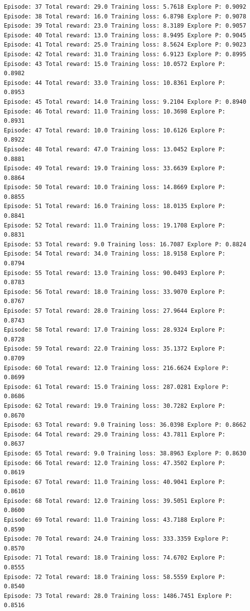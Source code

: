 \documentclass[11pt]{article}
\begin{document}
\begin{Verbatim}[commandchars=\\\{\}]
Episode: 37 Total reward: 29.0 Training loss: 5.7618 Explore P: 0.9092
Episode: 38 Total reward: 16.0 Training loss: 6.8798 Explore P: 0.9078
Episode: 39 Total reward: 23.0 Training loss: 8.3189 Explore P: 0.9057
Episode: 40 Total reward: 13.0 Training loss: 8.9495 Explore P: 0.9045
Episode: 41 Total reward: 25.0 Training loss: 8.5624 Explore P: 0.9023
Episode: 42 Total reward: 31.0 Training loss: 6.9123 Explore P: 0.8995
Episode: 43 Total reward: 15.0 Training loss: 10.0572 Explore P: 0.8982
Episode: 44 Total reward: 33.0 Training loss: 10.8361 Explore P: 0.8953
Episode: 45 Total reward: 14.0 Training loss: 9.2104 Explore P: 0.8940
Episode: 46 Total reward: 11.0 Training loss: 10.3698 Explore P: 0.8931
Episode: 47 Total reward: 10.0 Training loss: 10.6126 Explore P: 0.8922
Episode: 48 Total reward: 47.0 Training loss: 13.0452 Explore P: 0.8881
Episode: 49 Total reward: 19.0 Training loss: 33.6639 Explore P: 0.8864
Episode: 50 Total reward: 10.0 Training loss: 14.8669 Explore P: 0.8855
Episode: 51 Total reward: 16.0 Training loss: 18.0135 Explore P: 0.8841
Episode: 52 Total reward: 11.0 Training loss: 19.1708 Explore P: 0.8831
Episode: 53 Total reward: 9.0 Training loss: 16.7087 Explore P: 0.8824
Episode: 54 Total reward: 34.0 Training loss: 18.9158 Explore P: 0.8794
Episode: 55 Total reward: 13.0 Training loss: 90.0493 Explore P: 0.8783
Episode: 56 Total reward: 18.0 Training loss: 33.9070 Explore P: 0.8767
Episode: 57 Total reward: 28.0 Training loss: 27.9644 Explore P: 0.8743
Episode: 58 Total reward: 17.0 Training loss: 28.9324 Explore P: 0.8728
Episode: 59 Total reward: 22.0 Training loss: 35.1372 Explore P: 0.8709
Episode: 60 Total reward: 12.0 Training loss: 216.6624 Explore P: 0.8699
Episode: 61 Total reward: 15.0 Training loss: 287.0281 Explore P: 0.8686
Episode: 62 Total reward: 19.0 Training loss: 30.7282 Explore P: 0.8670
Episode: 63 Total reward: 9.0 Training loss: 36.0398 Explore P: 0.8662
Episode: 64 Total reward: 29.0 Training loss: 43.7811 Explore P: 0.8637
Episode: 65 Total reward: 9.0 Training loss: 38.8963 Explore P: 0.8630
Episode: 66 Total reward: 12.0 Training loss: 47.3502 Explore P: 0.8619
Episode: 67 Total reward: 11.0 Training loss: 40.9041 Explore P: 0.8610
Episode: 68 Total reward: 12.0 Training loss: 39.5051 Explore P: 0.8600
Episode: 69 Total reward: 11.0 Training loss: 43.7188 Explore P: 0.8590
Episode: 70 Total reward: 24.0 Training loss: 333.3359 Explore P: 0.8570
Episode: 71 Total reward: 18.0 Training loss: 74.6702 Explore P: 0.8555
Episode: 72 Total reward: 18.0 Training loss: 58.5559 Explore P: 0.8540
Episode: 73 Total reward: 28.0 Training loss: 1486.7451 Explore P: 0.8516

\end{Verbatim}
\end{document}
